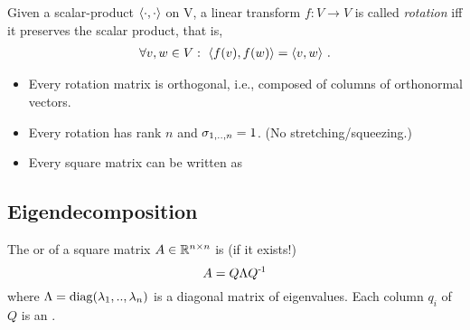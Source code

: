 \begin{myDefinition}[Rotation]
Given a scalar-product $\langle\cdot , \cdot\rangle$ on V, a linear transform $f:
V\to V$ is called \emph{rotation} iff it preserves the scalar product,
that is,
\begin{align}
\forall v,w\in V:~ \langle f(v), f(w)\rangle = \langle v,w\rangle ~.
\end{align}
\end{myDefinition}

\begin{itemize}
\item Every rotation matrix is orthogonal, i.e., composed
of columns of orthonormal vectors.

\item Every rotation has rank $n$ and $\sigma_{1,..,n}=1$. (No
stretching/squeezing.)

\item Every square matrix can be written as\\
\end{itemize}


\subsection{Eigendecomposition}

\begin{myDefinition}
The  or  of a
square matrix $A\in{\mathbb{R}}^{n\times n}$ is (if it exists!)
\begin{equation}
A=Q \Lambda Q^{{\hspace*{-.0pt}\text{\rm -}\hspace*{-.5pt}}1}
\end{equation}
where $\Lambda={\rm diag}(\lambda_1,..,\lambda_n)$ is a diagonal matrix of
eigenvalues. Each column $q_i$ of $Q$ is an .
\end{myDefinition}


